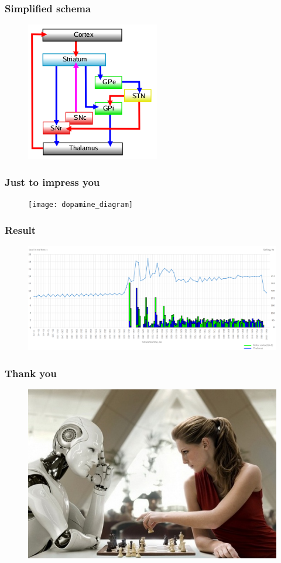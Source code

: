 \documentclass[12pt]{beamer}
\begin{document}
\begin{frame}
\frametitle{Simplified schema}
\begin{figure}
\includegraphics[width=0.5\linewidth]{nigrostriatal}
\end{figure}
\end{frame}


\begin{frame}
\frametitle{Just to impress you}
\begin{figure}
\texttt{[image: dopamine\_diagram]}
\end{figure}
\end{frame}


\begin{frame}
\frametitle{Result}
\begin{figure}
\includegraphics[width=1.0\textwidth]{resultBIG}
\end{figure}
\end{frame}


\begin{frame}
\frametitle{Thank you}
\begin{figure}
\includegraphics[width=0.8\linewidth]{ai_chess}
\end{figure}
\end{frame}

\end{document}

